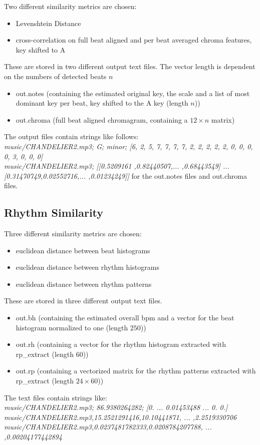 Two different similarity metrics are chosen: 
\begin{itemize}
	\setlength\itemsep{-0.5em}
	\item Levenshtein Distance
	\item cross-correlation on full beat aligned and per beat averaged chroma features, key shifted to A
\end{itemize}
These are stored in two different output text files. The vector length is dependent on the numbers of detected beats $n$
\begin{itemize}
	\setlength\itemsep{-0.5em}
	\item out.notes (containing the estimated original key, the scale and a list of most dominant key per beat, key shifted to the A key (length $n$))
	\item out.chroma (full beat aligned chromagram, containing a $12 \times n$ matrix)
\end{itemize}
The output files contain strings like follows:\\
\textit{music/CHANDELIER2.mp3; G; minor; [6, 2, 5, 7, 7, 7, 7, 2, 2, 2, 2, 2, 0, 0, 0, 0, 3, 0, 0, 0]}\\
\textit{music/CHANDELIER2.mp3; [[0.5209161 ,0.82440507,... ,0.68443549] ... [0.31470749,0.02552716,... ,0.01234249]]}
for the out.notes files and out.chroma files. 

\subsection{Rhythm Similarity}

Three different similarity metrics are chosen: 
\begin{itemize}
	\setlength\itemsep{-0.5em}
	\item euclidean distance between beat histograms
	\item euclidean distance between rhythm histograms
	\item euclidean distance between rhythm patterns
\end{itemize}
These are stored in three different output text files.
\begin{itemize}
	\setlength\itemsep{-0.5em}
	\item out.bh (containing the estimated overall bpm and a vector for the beat histogram normalized to one (length $250$))
	\item out.rh (containing a vector for the rhythm histogram extracted with rp\_extract (length $60$))
	\item out.rp (containing a vectorized matrix for the rhythm patterns extracted with rp\_extract (length $24 \times 60$))
\end{itemize}
The text files contain strings like:\\
\textit{music/CHANDELIER2.mp3; 86.9380264282; [0. ... 0.01453488 ...  0.  0.]}\\
\textit{music/CHANDELIER2.mp3,15.2521291416,10.10441871, ... ,2.2519330706}\\
\textit{music/CHANDELIER2.mp3,0.0237481782333,0.0208784207788, ... ,0.00204177442894}\\